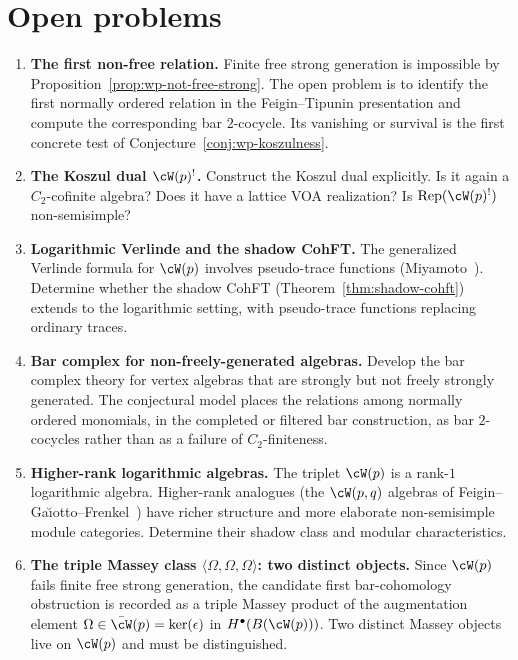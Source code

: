 
\section{Open problems}\label{sec:wp-open-problems}

\begin{enumerate}
\item \textbf{The first non-free relation.}
Finite free strong generation is impossible by
Proposition~\ref{prop:wp-not-free-strong}. The open problem is to
identify the first normally ordered relation in the
Feigin--Tipunin presentation and compute the corresponding bar
$2$-cocycle. Its vanishing or survival is the first concrete test of
Conjecture~\ref{conj:wp-koszulness}.

\item \textbf{The Koszul dual $\cW(p)^!$.}
Construct the Koszul dual explicitly. Is it again a
$C_2$-cofinite algebra? Does it have a lattice VOA
realization? Is $\operatorname{Rep}(\cW(p)^!)$
non-semisimple?

\item \textbf{Logarithmic Verlinde and the shadow CohFT.}
The generalized Verlinde formula for $\cW(p)$ involves
pseudo-trace functions (Miyamoto~\cite{Miyamoto04}).
Determine whether the shadow CohFT
(Theorem~\ref{thm:shadow-cohft}) extends to the
logarithmic setting, with pseudo-trace functions
replacing ordinary traces.

\item \textbf{Bar complex for non-freely-generated algebras.}
Develop the bar complex theory for vertex algebras that
are strongly but not freely strongly generated. The
conjectural model places the relations among normally ordered
monomials, in the completed or filtered bar construction, as bar
$2$-cocycles rather than as a failure of $C_2$-finiteness.

\item \textbf{Higher-rank logarithmic algebras.}
The triplet $\cW(p)$ is a rank-$1$ logarithmic algebra.
Higher-rank analogues (the $\cW(p,q)$ algebras of
Feigin--Ga\u{\i}otto--Frenkel~\cite{FGF2010}) have
richer structure and more elaborate non-semisimple
module categories. Determine their shadow class and
modular characteristics.

\item \textbf{The triple Massey class
$\langle \Omega, \Omega, \Omega \rangle$: two distinct objects.}
\label{item:wp-massey-omega-triple}
Since $\cW(p)$ fails finite free strong generation, the candidate
first bar-cohomology obstruction is recorded as a triple Massey
product of the augmentation element
$\Omega \in \bar\cW(p) = \ker(\epsilon)$ in
$H^\bullet(B(\cW(p)))$. Two distinct Massey objects live on
$\cW(p)$ and must be distinguished.


\end{enumerate}
